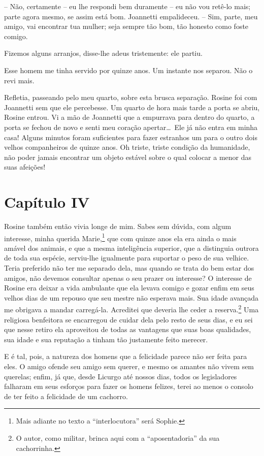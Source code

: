 -- Não, certamente -- eu lhe respondi bem duramente -- eu não vou retê-lo
mais; parte agora mesmo, se assim está bom. 
Joannetti empalideceu. -- Sim, parte, meu amigo, vai encontrar tua mulher; 
seja sempre tão bom, tão honesto como foste comigo.

 Fizemos alguns arranjos, disse-lhe adeus tristemente: ele partiu.

 Esse homem me tinha servido por quinze anos. Um instante nos separou.
Não o revi mais.

 Refletia, passeando pelo meu quarto, sobre esta brusca separação.
Rosine foi com Joannetti sem que ele percebesse. Um quarto de hora mais
tarde a porta se abriu, Rosine entrou. Vi a mão de Joannetti que a
empurrava para dentro do quarto, a porta se fechou de novo e senti meu
coração apertar\ldots\  Ele já não entra em minha casa! Alguns minutos
foram suficientes para fazer estranhos um para o outro dois velhos
companheiros de quinze anos. Oh triste, triste condição da humanidade,
não poder jamais encontrar um objeto estável sobre o qual colocar a
menor das suas afeições!

\section{Capítulo IV}

 Rosine também então vivia longe de mim. Sabes sem dúvida, com algum
interesse, minha querida Marie,\footnote{ Mais adiante no texto a
``interlocutora'' será Sophie.} que com quinze anos ela era ainda o mais
amável dos animais, e que a mesma inteligência superior, que a
distinguia outrora de toda sua espécie, serviu-lhe igualmente para
suportar o peso de sua velhice. Teria preferido não ter me separado
dela, mas quando se trata do bem estar dos amigos, não devemos
consultar apenas o seu prazer ou interesse? O interesse de Rosine era
deixar a vida ambulante que ela levava comigo e gozar enfim em seus
velhos dias de um repouso que seu mestre não esperava mais. Sua idade
avançada me obrigava a mandar carregá-la. Acreditei que deveria lhe
ceder a reserva.\footnote{ O autor, como militar, brinca aqui com a
``aposentadoria'' da sua cachorrinha.} Uma religiosa benfeitora se
encarregou de cuidar dela pelo resto de seus dias, e eu sei que nesse
retiro ela aproveitou de todas as vantagens que suas boas qualidades,
sua idade e sua reputação a tinham tão justamente feito merecer. 

 E é tal, pois, a natureza dos homens que a felicidade parece não ser
feita para eles. O amigo ofende seu amigo sem querer, e mesmo os
amantes não vivem sem querelas; enfim, já que, desde Licurgo até nossos
dias, todos os legisladores falharam em seus esforços para fazer os
homens felizes, terei ao menos o consolo de ter feito a felicidade de
um cachorro.

